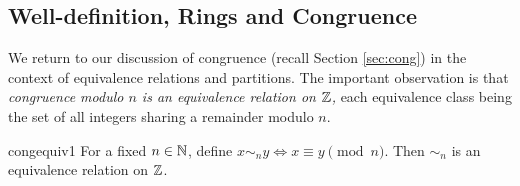 % 



\clearpage


\subsection{Well-definition, Rings and Congruence}\label{sec:welldefn}

We return to our discussion of congruence (recall Section \ref{sec:cong}) in the context of equivalence relations and partitions. The important observation is that \emph{congruence modulo $n$ is an equivalence relation on $\mathbb{Z}$,} each equivalence class being the set of all integers sharing a remainder modulo $n$.

\begin{thm}{}{congequiv1}
	For a fixed $n\in\mathbb{N}$, define $x\sim_n y\iff x\equiv y\pmod n$. Then $\sim_n$ is an equivalence relation on $\mathbb{Z}$.
\end{thm}

